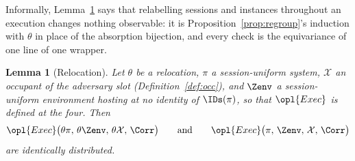 \documentclass[10pt,oneside,openany]{book}
\theoremstyle{accentdef}
\theoremstyle{accentplain}
\newtheorem{lemma}[definition]{Lemma}
\begin{document}
Informally, Lemma~\ref{lem:reloc} says that relabelling sessions and instances throughout an
execution changes nothing observable: it is Proposition~\ref{prop:regroup}'s induction with $\theta$ in
place of the absorption bijection, and every check is the equivariance of one line of one wrapper.

\begin{lemma}[Relocation]\label{lem:reloc}
Let $\theta$ be a relocation, $\pi$ a session-uniform system, $\mathcal{X}$ an occupant of the
adversary slot (Definition~\ref{def:occ}), and $\Zenv$ a session-uniform environment hosting at no
identity of $\IDs(\pi)$, so that $\opl{Exec}$ is defined at the four. Then
\[
  \opl{Exec}\bigl(\theta\pi,\,\theta\Zenv,\,\theta\mathcal{X},\,\Corr\bigr)
  \qquad\text{and}\qquad
  \opl{Exec}\bigl(\pi,\,\Zenv,\,\mathcal{X},\,\Corr\bigr)
\]
are identically distributed.
\end{lemma}
\end{document}
